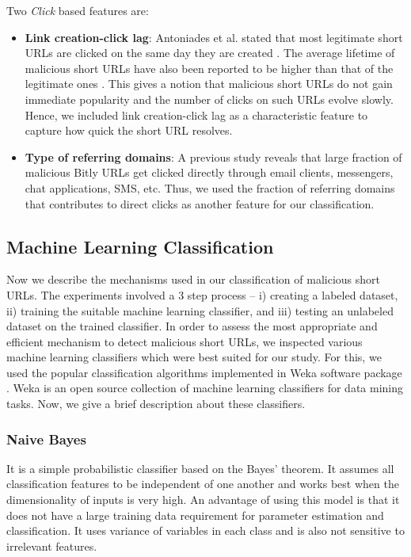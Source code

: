 \documentclass[conference]{IEEEtran}
\begin{document}
Two \textit{Click} based features are:
\begin{itemize}[leftmargin=0.4cm]
\item {\bf Link creation-click lag}: 
Antoniades et al. stated that most legitimate short URLs are clicked on the same day they are created \cite{3}. The average lifetime of malicious short URLs have also been reported to be higher than that of the legitimate ones \cite{4}. This gives a notion that malicious short URLs do not gain immediate popularity and the number of clicks on such URLs evolve slowly. Hence, we included link creation-click lag as a characteristic feature to capture how quick the short URL resolves.
\item {\bf Type of referring domains}: 
A previous study \cite{12} reveals that large fraction of malicious Bitly URLs get clicked directly through email clients, messengers, chat applications, SMS, etc. Thus, we used the fraction of referring domains that contributes to direct clicks as another feature for our classification. 
\end{itemize}

\subsection{Machine Learning Classification}
\vspace{4pt}
\label{sec:classifiers}
Now we describe the mechanisms used in our classification of malicious short URLs. The experiments involved a 3 step process -- i) creating a labeled dataset, ii) training the suitable machine learning classifier, and iii) testing an unlabeled dataset on the trained classifier. In order to assess the most appropriate and efficient mechanism to detect malicious short URLs, we inspected various machine learning classifiers which were best suited for our study. For this, we used the popular classification algorithms implemented in Weka software package \cite{15}. Weka is an open source collection of machine learning classifiers for data mining tasks. Now, we give a brief description about these classifiers.
\subsubsection{Naive Bayes} It is a simple probabilistic classifier based on the Bayes' theorem. It assumes all classification features to be independent of one another and works best when the dimensionality of inputs is very high. An advantage of using this model is that it does not have a large training data requirement for parameter estimation and classification. It uses variance of variables in each class and is also not sensitive to irrelevant features.
\end{document}
